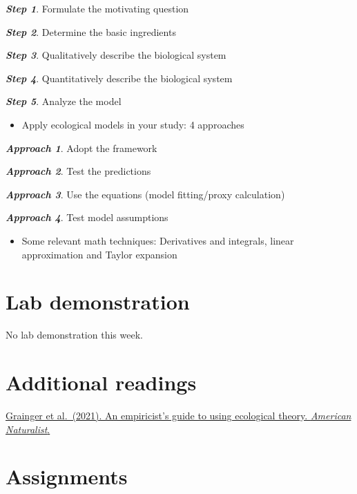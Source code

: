 \documentclass[
]{book}
\providecommand{\tightlist}{%
  \setlength{\itemsep}{0pt}\setlength{\parskip}{0pt}}
\begin{document}
{\textbf{\emph{Step 1}}. Formulate the motivating question}

{\textbf{\emph{Step 2}}. Determine the basic ingredients}

{\textbf{\emph{Step 3}}. Qualitatively describe the biological system}

{\textbf{\emph{Step 4}}. Quantitatively describe the biological system}

{\textbf{\emph{Step 5}}. Analyze the model}

\begin{itemize}
\tightlist
\item
  Apply ecological models in your study: 4 approaches
\end{itemize}

{\textbf{\emph{Approach 1}}. Adopt the framework}

{\textbf{\emph{Approach 2}}. Test the predictions}

{\textbf{\emph{Approach 3}}. Use the equations (model fitting/proxy calculation)}

{\textbf{\emph{Approach 4}}. Test model assumptions}

\begin{itemize}
\tightlist
\item
  Some relevant math techniques: Derivatives and integrals, linear approximation and Taylor expansion
\end{itemize}

\hypertarget{lab-demonstration}{%
\section*{Lab demonstration}\label{lab-demonstration}}

No lab demonstration this week.

\hypertarget{additional-readings}{%
\section*{Additional readings}\label{additional-readings}}

\href{./Additional\%20readings/Week1_Reading_Grainger_et_al_2021_AmNat.pdf}{Grainger et al.~(2021). An empiricist's guide to using ecological theory. \emph{American Naturalist}.}

\hypertarget{assignments}{%
\section*{Assignments}\label{assignments}}
\end{document}
